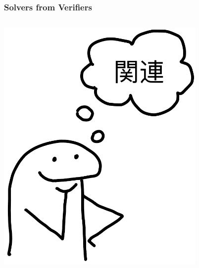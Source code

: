 \documentclass[xcolor={dvipsnames}, aspectratio=169]{beamer}
\begin{document}
\begin{frame}[fragile]
  \frametitle{Solvers from Verifiers}
  \begin{columns}    
    \begin{column}{0.35\textwidth}
      \centering
      \includegraphics[width=0.8\textwidth]{pic/kanren.jpg}
    \end{column}
    \begin{column}{0.75\textwidth} 

    \end{column}
  \end{columns} 
\end{frame}
\end{document}
